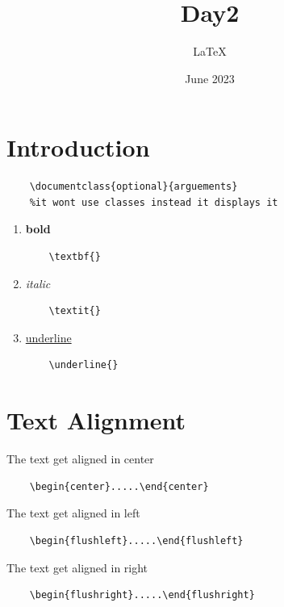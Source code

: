 \documentclass[12pt]{report}
\title{Day2}
\author{LaTeX}
\date{June 2023}
\begin{document}
\maketitle
\listoffigures
\newpage
\section{Introduction}
\begin{verbatim}
    \documentclass{optional}{arguements}
    %it wont use classes instead it displays it
\end{verbatim}
\begin{enumerate}
    \item \textbf{bold}
    \begin{verbatim}
    \textbf{}
    \end{verbatim}
    \item \textit{italic}
    \begin{verbatim}
    \textit{}
    \end{verbatim}
    \item \underline{underline}
    \begin{verbatim}
    \underline{}
    \end{verbatim}
\end{enumerate}
\newpage
\section{Text Alignment}
\begin{center}
The text get aligned in center
\begin{verbatim}
    \begin{center}.....\end{center}
\end{verbatim}
\end{center}
\begin{flushleft}
The text get aligned in left
\begin{verbatim}
    \begin{flushleft}.....\end{flushleft}
\end{verbatim}
\end{flushleft}
\begin{flushright}
The text get aligned in right
\begin{verbatim}
    \begin{flushright}.....\end{flushright}
\end{verbatim}
\end{flushright}
\newpage
\end{document}
